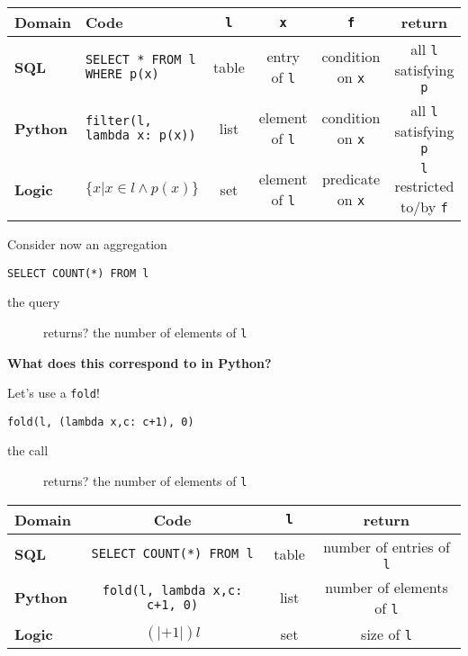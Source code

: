 \documentclass{beamer}
\begin{document}
\begin{textslide}
{
\tiny
\begin{tabular}{| l | p{2cm} | c | c | c | c |}
\hline
\textbf{Domain} & \textbf{Code} & \texttt{l} & \texttt{x} & \texttt{f} & \textbf{return} \\
\hline
\textbf{SQL} & \texttt{SELECT * FROM l WHERE p(x)} & table & entry of \texttt{l} & condition on \texttt{x} & all \texttt{l} satisfying \texttt{p} \\
\hline
\textbf{Python} & \texttt{filter(l, lambda x: p(x))} & list & element of \texttt{l} & condition on \texttt{x} & all \texttt{l} satisfying \texttt{p} \\
\hline
\textbf{Logic} \pause & $\{ x | x \in l \wedge p(x) \}$ & set & element of \texttt{l} & predicate on \texttt{x} & \texttt{l} restricted to/by \texttt{f} \\
\hline
\end{tabular}
}
\end{textslide}

\begin{slide}{
\item Consider now an aggregation
\item \texttt{SELECT COUNT(*) FROM l}
\begin{description}
\item[the query] returns? the number of elements of \texttt{l}
\end{description}
\item \textbf{What does this correspond to in Python?}
}\end{slide}

\begin{slide}{
\item Let's use a \texttt{fold}!
\item \texttt{fold(l, (lambda x,c: c+1), 0)}
\begin{description}
\item[the call] returns? the number of elements of \texttt{l}
\end{description}
}\end{slide}

\begin{textslide}
{
\tiny
\begin{tabular}{| l | c | c | c |}
\hline
\textbf{Domain} & \textbf{Code} & \texttt{l} & \textbf{return} \\
\hline
\textbf{SQL} & \texttt{SELECT COUNT(*) FROM l} & table & number of entries of \texttt{l} \\
\hline
\textbf{Python} & \texttt{fold(l, lambda x,c: c+1, 0)} & list & number of elements of \texttt{l} \\
\hline
\textbf{Logic} \pause & $(|+1|) l $ & set & size of \texttt{l} \\
\hline
\end{tabular}
}
\end{textslide}
\end{document}
